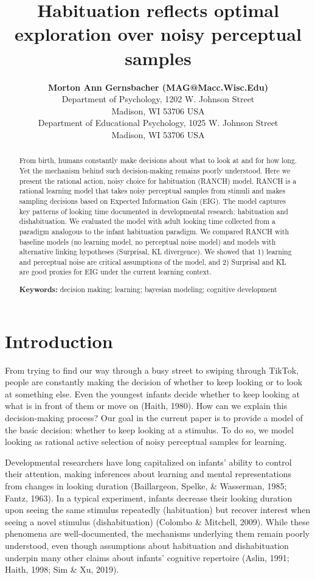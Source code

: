 \documentclass[10pt, letterpaper]{article}
\title{Habituation reflects optimal exploration over noisy perceptual
samples}
\author{{\large \bf Morton Ann Gernsbacher (MAG@Macc.Wisc.Edu)} \\ Department of Psychology, 1202 W. Johnson Street \\ Madison, WI 53706 USA \AND {\large \bf Sharon J.~Derry (SDJ@Macc.Wisc.Edu)} \\ Department of Educational Psychology, 1025 W. Johnson Street \\ Madison, WI 53706 USA}
\begin{document}
\maketitle

\begin{abstract}
From birth, humans constantly make decisions about what to look at and
for how long. Yet the mechanism behind such decision-making remains
poorly understood. Here we present the rational action, noisy choice for
habituation (RANCH) model. RANCH is a rational learning model that takes
noisy perceptual samples from stimuli and makes sampling decisions based
on Expected Information Gain (EIG). The model captures key patterns of
looking time documented in developmental research: habituation and
dishabituation. We evaluated the model with adult looking time collected
from a paradigm analogous to the infant habituation paradigm. We
compared RANCH with baseline models (no learning model, no perceptual
noise model) and models with alternative linking hypotheses (Surprisal,
KL divergence). We showed that 1) learning and perceptual noise are
critical assumptions of the model, and 2) Surprisal and KL are good
proxies for EIG under the current learning context.

\textbf{Keywords:}
decision making; learning; bayesian modeling; cognitive development
\end{abstract}

\hypertarget{introduction}{%
\section{Introduction}\label{introduction}}

From trying to find our way through a busy street to swiping through
TikTok, people are constantly making the decision of whether to keep
looking or to look at something else. Even the youngest infants decide
whether to keep looking at what is in front of them or move on (Haith,
1980). How can we explain this decision-making process? Our goal in the
current paper is to provide a model of the basic decision: whether to
keep looking at a stimulus. To do so, we model looking as rational
active selection of noisy perceptual samples for learning.

Developmental researchers have long capitalized on infants' ability to
control their attention, making inferences about learning and mental
representations from changes in looking duration (Baillargeon, Spelke,
\& Wasserman, 1985; Fantz, 1963). In a typical experiment, infants
decrease their looking duration upon seeing the same stimulus repeatedly
(habituation) but recover interest when seeing a novel stimulus
(dishabituation) (Colombo \& Mitchell, 2009). While these phenomena are
well-documented, the mechanisms underlying them remain poorly
understood, even though assumptions about habituation and dishabituation
underpin many other claims about infants' cognitive repertoire (Aslin,
1991; Haith, 1998; Sim \& Xu, 2019).
\end{document}
